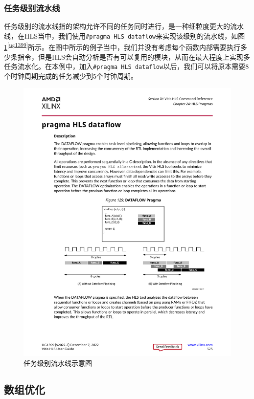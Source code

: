 \subsubsection{任务级别流水线}

任务级别的流水线指的架构允许不同的任务同时进行，是一种细粒度更大的流水线，在HLS当中，我们使用\verb|#pragma HLS dataflow|来实现该级别的流水线，如图\ref{fig:pragma_dataflow}\textsuperscript{\ref {ug1399}}所示。在图中所示的例子当中，我们并没有考虑每个函数内部需要执行多少条指令，但是HLS会自动分析是否有可以复用的模块，从而在最大程度上实现多任务流水化。在本例中，加入\verb|#pragma HLS dataflow|以后，我们可以将原本需要8个时钟周期完成的任务减少到5个时钟周期。

\begin{figure}[htbp]
    \centering
    \includegraphics[width=\linewidth]{figures/pragma dataflow.pdf}
    \caption{任务级别流水线示意图}
    \label{fig:pragma_dataflow}
\end{figure}

\subsection{数组优化}
